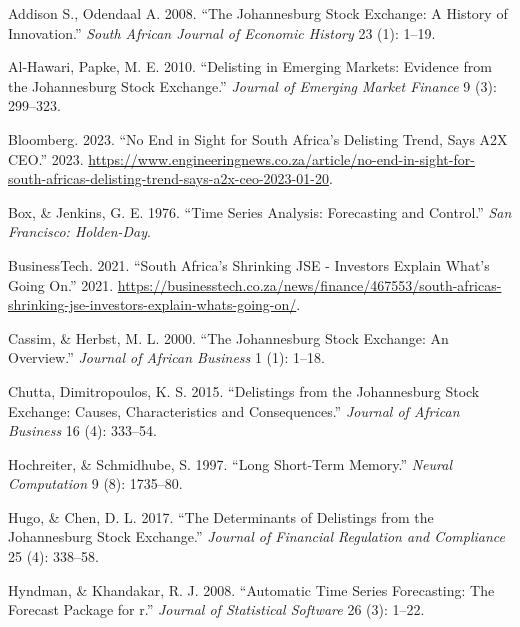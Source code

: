 \documentclass[
]{article}
\newlength{\cslhangindent}
\newlength{\cslentryspacingunit} %
\newenvironment{CSLReferences}[2] %
 {%
  \setlength{\parindent}{0pt}
  \ifodd #1
  \let\oldpar\par
  \def\par{\hangindent=\cslhangindent\oldpar}
  \fi
  \setlength{\parskip}{#2\cslentryspacingunit}
 }%
 {}
\begin{document}
\hypertarget{refs}{}
\begin{CSLReferences}{1}{0}
\leavevmode{}%
Addison S., Odendaal A. 2008. {``The Johannesburg Stock Exchange: A
History of Innovation.''} \emph{South African Journal of Economic
History} 23 (1): 1--19.

\leavevmode{}%
Al-Hawari, Papke, M. E. 2010. {``Delisting in Emerging Markets: Evidence
from the Johannesburg Stock Exchange.''} \emph{Journal of Emerging
Market Finance} 9 (3): 299--323.

\leavevmode{}%
Bloomberg. 2023. {``No End in Sight for South Africa's Delisting Trend,
Says A2X CEO.''} 2023.
\url{https://www.engineeringnews.co.za/article/no-end-in-sight-for-south-africas-delisting-trend-says-a2x-ceo-2023-01-20}.

\leavevmode{}%
Box, \& Jenkins, G. E. 1976. {``Time Series Analysis: Forecasting and
Control.''} \emph{San Francisco: Holden-Day}.

\leavevmode{}%
BusinessTech. 2021. {``South Africa's Shrinking JSE - Investors Explain
What's Going On.''} 2021.
\url{https://businesstech.co.za/news/finance/467553/south-africas-shrinking-jse-investors-explain-whats-going-on/}.

\leavevmode{}%
Cassim, \& Herbst, M. L. 2000. {``The Johannesburg Stock Exchange: An
Overview.''} \emph{Journal of African Business} 1 (1): 1--18.

\leavevmode{}%
Chutta, Dimitropoulos, K. S. 2015. {``Delistings from the Johannesburg
Stock Exchange: Causes, Characteristics and Consequences.''}
\emph{Journal of African Business} 16 (4): 333--54.

\leavevmode{}%
Hochreiter, \& Schmidhube, S. 1997. {``Long Short-Term Memory.''}
\emph{Neural Computation} 9 (8): 1735--80.

\leavevmode{}%
Hugo, \& Chen, D. L. 2017. {``The Determinants of Delistings from the
Johannesburg Stock Exchange.''} \emph{Journal of Financial Regulation
and Compliance} 25 (4): 338--58.

\leavevmode{}%
Hyndman, \& Khandakar, R. J. 2008. {``Automatic Time Series Forecasting:
The Forecast Package for r.''} \emph{Journal of Statistical Software} 26
(3): 1--22.


\end{CSLReferences}
\end{document}
